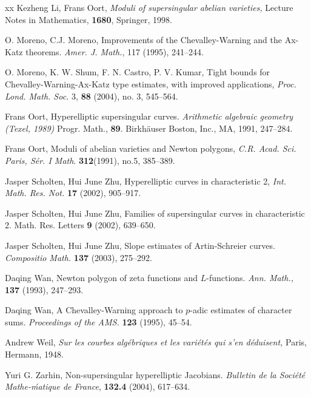 \documentclass{amsart}
\numberwithin{equation}{section}
\theoremstyle{plain}
\theoremstyle{definition}
\begin{document}
\begin{thebibliography}{xx}
Kezheng Li, Frans Oort, 
{\it Moduli of supersingular abelian varieties,} 
Lecture Notes in Mathematics, {\bf 1680}, 
Springer, 1998.

O. Moreno, C.J. Moreno,
Improvements of the Chevalley-Warning and the Ax-Katz theorems.
{\it Amer. J. Math.},
117 (1995), 241--244.

O. Moreno, K. W. Shum, F. N. Castro, P. V. Kumar,
Tight bounds for Chevalley-Warning-Ax-Katz type estimates,
with improved applications,
{\it Proc. Lond. Math. Soc.} 3, {\bf 88} (2004), no. 3, 545--564. 
 
Frans Oort,
Hyperelliptic supersingular curves.
{\it Arithmetic algebraic geometry (Texel, 1989)}
Progr. Math., {\bf 89}. Birkh\"auser Boston, Inc., MA, 1991, 247--284. 

Frans Oort,
Moduli of abelian varieties and Newton polygons, 
{\it C.R. Acad. Sci. Paris, S\'er. I Math}. 
{\bf 312}(1991), no.5, 385--389.
 
Jasper Scholten, Hui June Zhu,
Hyperelliptic curves in characteristic 2,
{\it Int. Math. Res. Not.}
{\bf 17} (2002), 905--917.

Jasper Scholten, Hui June Zhu,
Families of supersingular curves in characteristic 2. 
Math. Res. Letters {\bf 9} (2002), 639--650.

Jasper Scholten, Hui June Zhu,
Slope estimates of Artin-Schreier curves.
{\it Compositio Math.} {\bf 137} (2003), 275--292.

Daqing Wan, Newton polygon of zeta functions and $L$-functions. 
{\it Ann. Math.,} {\bf 137} (1993), 247--293.

Daqing Wan, A Chevalley-Warning approach to $p$-adic estimates of character sums.
{\it Proceedings of the AMS.}
{\bf 123} (1995), 45--54. 


Andrew Weil, 
{\it Sur les courbes alg\'ebriques et les vari\'et\'es qui s'en d\'eduisent,} 
Paris, Hermann, 1948.     

Yuri G. Zarhin,
Non-supersingular hyperelliptic Jacobians.
{\it Bulletin de la Soci\'et\'e Mathe-\'matique de France},
{\bf 132.4} (2004), 617--634.


\end{thebibliography}  
\end{document}
